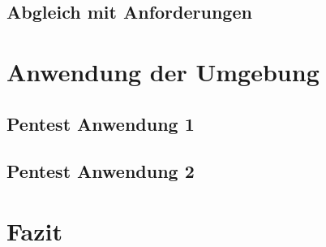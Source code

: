 \documentclass[11pt,DIV=11,twoside, openright, BCOR=3mm]{scrreprt} %
\begin{document}
	     		\section{Abgleich mit Anforderungen}
	     	\chapter{Anwendung der Umgebung}
	     		\section{Pentest Anwendung 1}
	     		\section{Pentest Anwendung 2}
	     	\chapter{Fazit}
                \cleardoublepage	
	
			
			
			
			\newpage
			\printbibliography %
		
	
\end{document}
